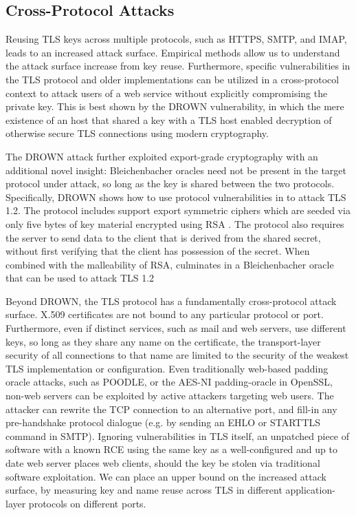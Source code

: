\subsection{Cross-Protocol Attacks}

Reusing TLS keys across multiple protocols, such as HTTPS, SMTP, and IMAP,
leads to an increased attack surface. Empirical methods allow us to understand
the attack surface increase from key reuse. Furthermore, specific
vulnerabilities in the TLS protocol and older implementations can be utilized
in a cross-protocol context to attack users of a web service without explicitly
compromising the private key. This is best shown by the DROWN vulnerability, in
which the mere existence of an \ssltwo host that shared a key with a TLS host
enabled decryption of otherwise secure TLS connections using modern
cryptography.

The DROWN attack further exploited export-grade cryptography with an additional
novel insight: Bleichenbacher oracles need not be present in the target
protocol under attack, so long as the key is shared between the two protocols.
Specifically, DROWN shows how to use protocol vulnerabilities in \ssltwo to
attack TLS 1.2. The \ssltwo protocol includes support export symmetric ciphers
which are seeded via only five bytes of key material encrypted using RSA \PKCS.
The \ssltwo protocol also requires the server to send data to the client that is
derived from the shared secret, without first verifying that the client has
possession of the secret. When combined with the malleability of RSA,
culminates in a Bleichenbacher oracle that can be used to attack TLS 1.2

Beyond DROWN, the TLS protocol has a fundamentally cross-protocol attack
surface. X.509 certificates are not bound to any particular protocol or port.
Furthermore, even if distinct services, such as mail and web servers, use
different keys, so long as they share any name on the certificate, the
transport-layer security of all connections to that name are limited to the
security of the weakest TLS implementation or configuration. Even traditionally
web-based padding oracle attacks, such as POODLE, or the AES-NI padding-oracle
in OpenSSL, non-web servers can be exploited by active attackers targeting web
users. The attacker can rewrite the TCP connection to an alternative port, and
fill-in any pre-handshake protocol dialogue (e.g. by sending an EHLO or
STARTTLS command in SMTP). Ignoring vulnerabilities in TLS itself, an unpatched
piece of software with a known RCE using the same key as a well-configured and
up to date web server places web clients, should the key be stolen via
traditional software exploitation. We can place an upper bound on the increased
attack surface, by measuring key and name reuse across TLS in different
application-layer protocols on different ports.


